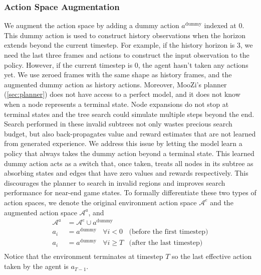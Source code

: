 \subsubsection{Action Space Augmentation} \label{sec:a_aug}
We augment the action space by adding a dummy action $a^\text{dummy}$ indexed at 0.
This dummy action is used to construct history observations when the horizon extends beyond the current timestep.
For example, if the history horizon is 3, we need the last three frames and actions to construct the input observation to the policy.
However, if the current timestep is 0, the agent hasn't taken any actions yet.
We use zeroed frames with the same shape as history frames, and the augmented dummy action as history actions.
Moreover, MooZi's planner (\ref{sec:planner}) does not have access to a perfect model, and it does not know when a node represents a terminal state.
Node expansions do not stop at terminal states and the tree search could simulate multiple steps beyond the end.
Search performed in these invalid subtrees not only wastes precious search budget, but also back-propagates value and reward estimates that are not learned from generated experience.
We address this issue by letting the model learn a policy that always takes the dummy action beyond a terminal state.
This learned dummy action acts as a switch that, once taken, treats all nodes in its subtree as absorbing states and edges that have zero values and rewards respectively.
This discourages the planner to search in invalid regions and improves search performance for near-end game states.
To formally differentiate these two types of action spaces, we denote the original environment action space $\mathcal{A}^e$ and the augmented action space $\mathcal{A}^a$, and
\begin{align*}
    \mathcal{A}^a  & = \mathcal{A}^e \cup a^\text{dummy}  \\
    a_{i}          & = a^\text{dummy} ~~~~ \forall i < 0     & \text{(before the first timestep)}  \\
    a_{i}          & = a^\text{dummy} ~~~~ \forall i \geq T  & \text{(after the last timestep)}  \\
\end{align*}
Notice that the environment terminates at timestep $T$ so the last effective action taken by the agent is $a_{T-1}$.

